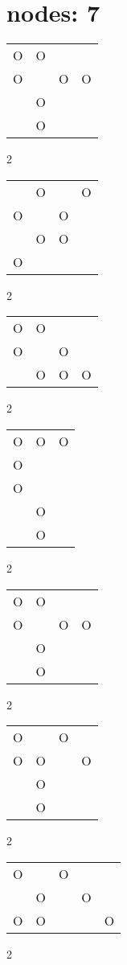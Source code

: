 \section{nodes: 7}
\begin{tabular}{|m{0.2cm}m{0.2cm}m{0.2cm}m{0.2cm}|}\hline
O&O& & \\
O& &O&O\\
 &O& & \\
 &O& & \\
\hline\end{tabular}2
\begin{tabular}{|m{0.2cm}m{0.2cm}m{0.2cm}m{0.2cm}|}\hline
 &O& &O\\
O& &O& \\
 &O&O& \\
O& & & \\
\hline\end{tabular}2
\begin{tabular}{|m{0.2cm}m{0.2cm}m{0.2cm}m{0.2cm}|}\hline
O&O& & \\
O& &O& \\
 &O&O&O\\
\hline\end{tabular}2
\begin{tabular}{|m{0.2cm}m{0.2cm}m{0.2cm}|}\hline
O&O&O\\
O& & \\
O& & \\
 &O& \\
 &O& \\
\hline\end{tabular}2
\begin{tabular}{|m{0.2cm}m{0.2cm}m{0.2cm}m{0.2cm}|}\hline
O&O& & \\
O& &O&O\\
 &O& & \\
 &O& & \\
\hline\end{tabular}2
\begin{tabular}{|m{0.2cm}m{0.2cm}m{0.2cm}m{0.2cm}|}\hline
O& &O& \\
O&O& &O\\
 &O& & \\
 &O& & \\
\hline\end{tabular}2
\begin{tabular}{|m{0.2cm}m{0.2cm}m{0.2cm}m{0.2cm}m{0.2cm}|}\hline
O& &O& & \\
 &O& &O& \\
O&O& & &O\\
\hline\end{tabular}2
